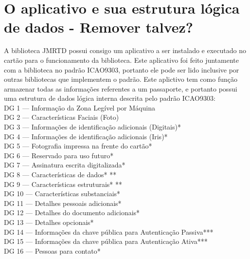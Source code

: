 \documentclass{article}
\begin{document}
	\section{O aplicativo e sua estrutura lógica de dados - Remover talvez?}
		\begin{justify}

			\hspace{2cm} A biblioteca JMRTD possui consigo um aplicativo a ser instalado e executado no cartão para o funcionamento da biblioteca\cite{SASSO}. Este aplicativo foi feito juntamente com a biblioteca no padrão ICAO9303, portanto ele pode ser lido inclusive por outras bibliotecas que implementem o padrão. Este aplictivo tem como função armazenar todas as informações referentes a um passaporte, e portanto possui uma estrutura de dados lógica interna descrita pelo padrão ICAO9303:\\
			
			\hspace*{1.5cm} DG 1 — Informação da Zona Legível por Máquina\\
			\hspace*{2cm} DG 2 — Características Faciais (Foto)\\
			\hspace*{2cm} DG 3 — Informações de identificação adicionais (Digitais)*\\
			\hspace*{2cm} DG 4 — Informações de identificação adicionais (Iris)*\\
			\hspace*{2cm} DG 5 — Fotografia impressa na frente do cartão*\\
			\hspace*{2cm} DG 6 — Reservado para uso futuro*\\
			\hspace*{2cm} DG 7 — Assinatura escrita digitalizada*\\
			\hspace*{2cm} DG 8 — Características de dados* **\\
			\hspace*{2cm} DG 9 — Características estruturais* **\\
			\hspace*{2cm} DG 10 — Características substanciais*\\
			\hspace*{2cm} DG 11 — Detalhes pessoais adicionais*\\
			\hspace*{2cm} DG 12 — Detalhes do documento adicionais*\\
			\hspace*{2cm} DG 13 — Detalhes opcionais*\\
			\hspace*{2cm} DG 14 — Informações da chave pública para Autenticação Passiva***\\
			\hspace*{2cm} DG 15 — Informações da chave pública para Autenticação Ativa***\\
			\hspace*{2cm} DG 16 — Pessoas para contato*\\


\end{justify}
\end{document}

